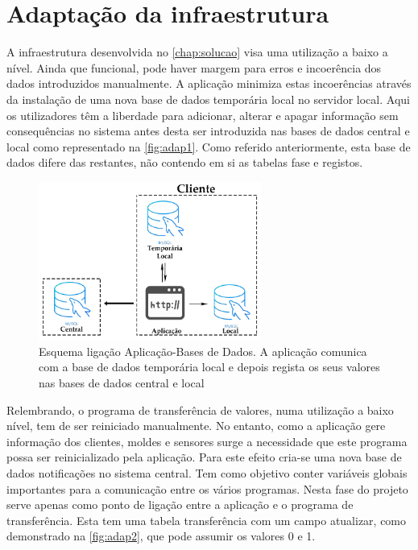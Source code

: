\documentclass[11pt,twoside,a4paper]{report}
\begin{document}
\section{Adaptação da infraestrutura}
\label{subchap:adap}
A infraestrutura desenvolvida no \autoref{chap:solucao} visa uma utilização a baixo a nível. Ainda que funcional, pode haver margem para erros e incoerência dos dados introduzidos manualmente. A aplicação minimiza estas incoerências através da instalação de uma nova base de dados temporária local no servidor local. Aqui os utilizadores têm a liberdade para adicionar, alterar e apagar informação sem consequências no sistema antes desta ser introduzida nas bases de dados central e local como representado na \autoref{fig:adap1}. Como referido anteriormente, esta base de dados difere das restantes, não contendo em si as tabelas fase e registos.
\begin{figure}[H]
	\begin{center}
		\includegraphics[width=0.65\textwidth]{Aplicacao_temp_local_central} %
		\caption{Esquema ligação Aplicação-Bases de Dados. A aplicação comunica com a base de dados temporária local e depois regista os seus valores nas bases de dados central e local}
		\label{fig:adap1}
	\end{center}
\end{figure}
Relembrando, o programa de transferência de valores, numa utilização a baixo nível, tem de ser reiniciado manualmente. No entanto, como a aplicação gere informação dos clientes, moldes e sensores surge a necessidade que este programa possa ser reinicializado pela aplicação. Para este efeito cria-se uma nova base de dados notificações no sistema central. Tem como objetivo conter variáveis globais importantes para a comunicação entre os vários programas. Nesta fase do projeto serve apenas como ponto de ligação entre a aplicação e o programa de transferência. Esta tem uma tabela transferência com um campo atualizar, como demonstrado na \autoref{fig:adap2}, que pode assumir os valores 0 e 1.
\end{document}
